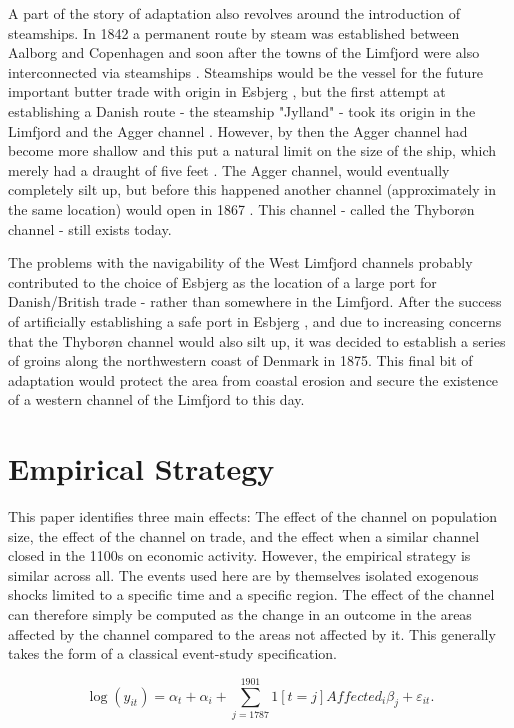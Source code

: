 \documentclass[11pt]{article}
\begin{document}
A part of the story of adaptation also revolves around the introduction of steamships. In 1842 a permanent route by steam was established between Aalborg and Copenhagen and soon after the towns of the Limfjord were also interconnected via steamships \citep{Klem1967}. Steamships would be the vessel for the future important butter trade with origin in Esbjerg \citep{Lampe2015DanesUK}, but the first attempt at establishing a Danish route - the steamship "Jylland" - took its origin in the Limfjord and the Agger channel \citep[p. 62]{Schovelin1891}. However, by then the Agger channel had become more shallow and this put a natural limit on the size of the ship, which merely had a draught of five feet \citep{Lassen1883}. The Agger channel, would eventually completely silt up, but before this happened another channel (approximately in the same location) would open in 1867 \citep{Petersen1877}. This channel - called the Thyborøn channel - still exists today.

The problems with the navigability of the West Limfjord channels probably contributed to the choice of Esbjerg as the location of a large port for Danish/British trade - rather than somewhere in the Limfjord. After the success of artificially establishing a safe port in Esbjerg \citep{Lampe2015DanesUK}, and due to increasing concerns that the Thyborøn channel would also silt up, it was decided to establish a series of groins along the northwestern coast of Denmark in 1875. This final bit of adaptation would protect the area from coastal erosion and secure the existence of a western channel of the Limfjord to this day.

\section{Empirical Strategy}
This paper identifies three main effects: The effect of the channel on population size, the effect of the channel on trade, and the effect when a similar channel closed in the 1100s on economic activity. However, the empirical strategy is similar across all. The events used here are by themselves isolated exogenous shocks limited to a specific time and a specific region. The effect of the channel can therefore simply be computed as the change in an outcome in the areas affected by the channel compared to the areas not affected by it. This generally takes the form of a classical event-study specification.

\begin{equation}
\label{eq:eq501}
\log(y_{it})= \alpha_t + \alpha_i + \sum_{j=1787}^{1901} 1[t=j]Affected_{i}\beta_{j} + \varepsilon_{it}.
\end{equation}
\end{document}
